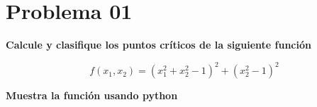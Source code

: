 \section*{Problema 01}

\textbf{Calcule y clasifique los puntos críticos de la siguiente función}

\begin{equation*}
    f(x_1,x_2) = (x_1^2+x_2^2-1)^2+(x_2^2-1)^2
\end{equation*}

\textbf{Muestra la función usando python}